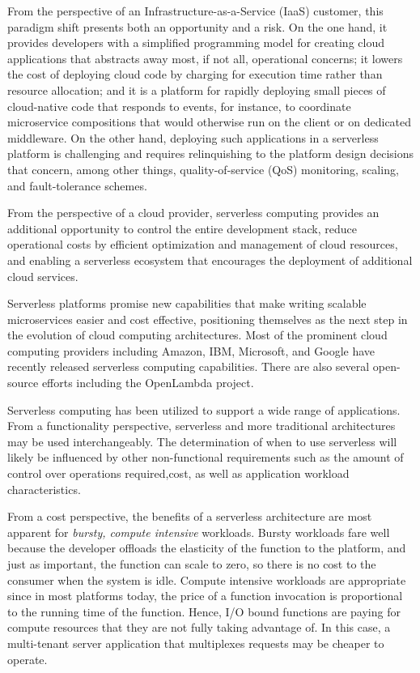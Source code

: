 \documentclass[conference]{IEEEtran}
\begin{document}
From the perspective of an Infrastructure-as-a-Service (IaaS) customer, this paradigm shift presents both an opportunity and a risk. On the one hand, it provides developers with a simplified programming model for creating cloud applications that abstracts away most, if not all, operational concerns; it lowers the cost of deploying cloud code by charging for execution time rather than resource allocation; and it is a platform for rapidly deploying small pieces of cloud-native code that responds to events, for instance, to coordinate microservice compositions that would otherwise run on the client or on dedicated middleware. On the other hand, deploying such applications in a serverless platform is challenging and requires relinquishing to the platform design decisions that concern, among other things, quality-of-service (QoS) monitoring, scaling, and fault-tolerance schemes.

From the perspective of a cloud provider, serverless computing provides an additional opportunity to control the entire development stack, reduce operational costs by efficient optimization and management of cloud resources, and enabling a serverless ecosystem that encourages the deployment of additional cloud services.

Serverless platforms promise new capabilities that make writing scalable microservices easier and cost effective, positioning themselves as the next step in the evolution of cloud computing architectures. Most of the prominent cloud computing providers including Amazon, IBM, Microsoft, and Google have recently released serverless computing capabilities. There are also several open-source efforts including the OpenLambda project.

Serverless computing has been utilized to support a wide range of applications. From a functionality perspective, serverless and more traditional architectures may be used interchangeably. The determination of when to use serverless will likely be influenced by other non-functional requirements such as the amount of control over operations required,cost, as well as application workload characteristics.

From a cost perspective, the benefits of a serverless architecture are most apparent for \emph{bursty, compute intensive} workloads. Bursty workloads fare well because the developer offloads the elasticity of the function to the platform, and just as important, the function can
scale to zero, so there is no cost to the consumer when the system is idle. Compute intensive workloads are appropriate since in most platforms today, the price of a function invocation is proportional to the running time of the function. Hence, I/O bound functions are
paying for compute resources that they are not fully taking advantage of. In this case, a multi-tenant server application that multiplexes requests may be cheaper to operate.
\end{document}
